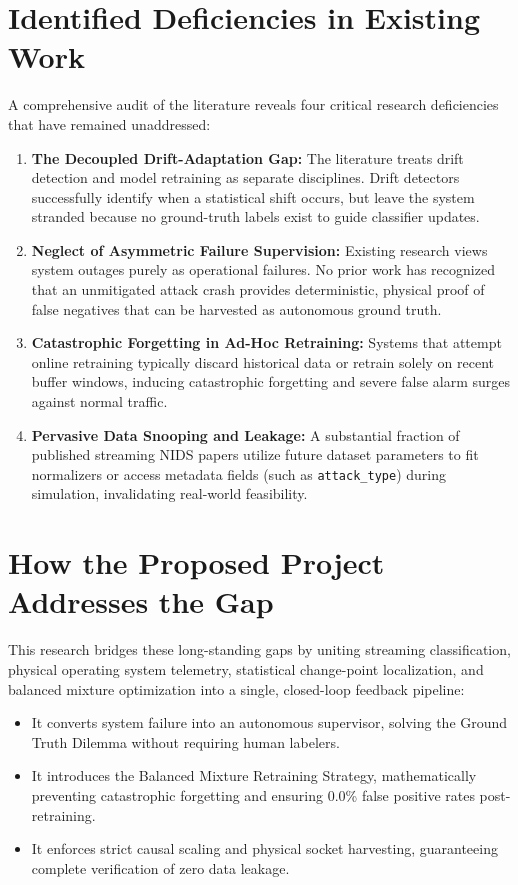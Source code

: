 \documentclass[12pt,a4paper,oneside]{report}
\begin{document}
\section{Identified Deficiencies in Existing Work}
A comprehensive audit of the literature reveals four critical research deficiencies that have remained unaddressed:
\begin{enumerate}
    \item \textbf{The Decoupled Drift-Adaptation Gap:} The literature treats drift detection and model retraining as separate disciplines. Drift detectors successfully identify when a statistical shift occurs, but leave the system stranded because no ground-truth labels exist to guide classifier updates.
    \item \textbf{Neglect of Asymmetric Failure Supervision:} Existing research views system outages purely as operational failures. No prior work has recognized that an unmitigated attack crash provides deterministic, physical proof of false negatives that can be harvested as autonomous ground truth.
    \item \textbf{Catastrophic Forgetting in Ad-Hoc Retraining:} Systems that attempt online retraining typically discard historical data or retrain solely on recent buffer windows, inducing catastrophic forgetting and severe false alarm surges against normal traffic.
    \item \textbf{Pervasive Data Snooping and Leakage:} A substantial fraction of published streaming NIDS papers utilize future dataset parameters to fit normalizers or access metadata fields (such as \texttt{attack\_type}) during simulation, invalidating real-world feasibility.
\end{enumerate}

\section{How the Proposed Project Addresses the Gap}
This research bridges these long-standing gaps by uniting streaming classification, physical operating system telemetry, statistical change-point localization, and balanced mixture optimization into a single, closed-loop feedback pipeline:
\begin{itemize}
    \item It converts system failure into an autonomous supervisor, solving the Ground Truth Dilemma without requiring human labelers.
    \item It introduces the Balanced Mixture Retraining Strategy, mathematically preventing catastrophic forgetting and ensuring 0.0\% false positive rates post-retraining.
    \item It enforces strict causal scaling and physical socket harvesting, guaranteeing complete verification of zero data leakage.
\end{itemize}
\end{document}
